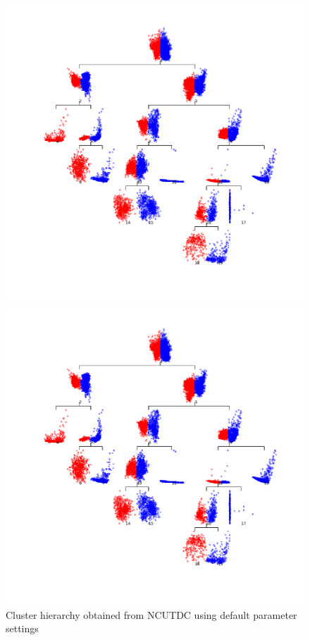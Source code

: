\documentclass{book}
\begin{document}
\begin{figure}
%
\begin{latexonly}
%
\begin{center}
\includegraphics[scale=0.3]{figures/ncut1.png}
\end{center}
%
\end{latexonly}
%
\begin{htmlonly}
%
\includegraphics[scale=0.7]{figures/ncut1.png}
%
\end{htmlonly}
%
\caption{Cluster hierarchy obtained from NCUTDC using default parameter settings}
%
\label{fig:ncut1}
\end{figure}
\end{document}
